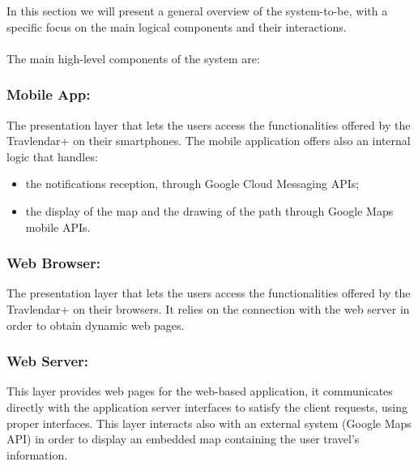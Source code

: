 In this section we will present a general overview of the system-to-be, with a specific focus on the main logical components and their interactions. \\ \\
The main high-level components of the system are:
\subsubsection{Mobile App:}
\label{subsubsect:Mobile App}
The presentation layer that lets the users access the functionalities offered by the Travlendar+ on their smartphones. The mobile application offers also an internal logic that handles:
\begin{itemize}
	\item the notifications reception, through Google Cloud Messaging APIs;
	\item the display of the map and the drawing of the path through Google Maps mobile APIs.
\end{itemize}  

\subsubsection{Web Browser:}
\label{subsubsect:Web Browser}
The presentation layer that lets the users access the functionalities offered by the Travlendar+ on their browsers.
It relies on the connection with the web server in order to obtain dynamic web pages.

\subsubsection{Web Server:}
\label{subsubsect:Web Server}
This layer provides web pages for the web-based application, it communicates directly with the application server interfaces to satisfy the client requests, using proper interfaces. This layer interacts also with an external system (Google Maps API) in order to display an embedded map containing the user travel's information.

